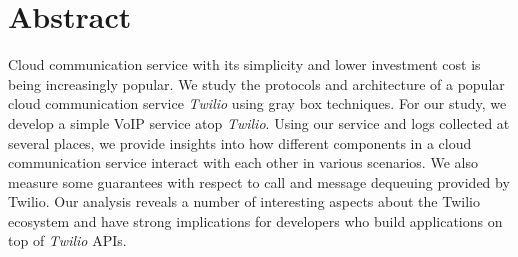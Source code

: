 \section{Abstract}
\label{sec-abstract}
Cloud communication service with its simplicity and lower investment cost is being increasingly popular.
We study the protocols and architecture of a popular cloud communication service \textit{Twilio} using gray box techniques. For our study, we develop a simple VoIP service atop \textit{Twilio}. Using our service and logs collected at several places, we provide insights into how different components in a cloud communication service interact with each other in various scenarios. We also measure some guarantees with respect to call and message dequeuing provided by Twilio. Our analysis reveals a number of interesting aspects about the Twilio ecosystem and have strong implications for developers who build applications on top of \textit{Twilio} APIs.
